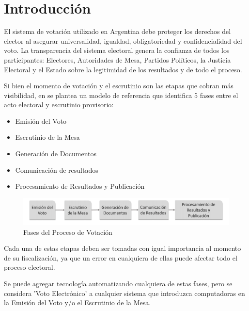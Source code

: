 \documentclass{llncs}
\begin{document}
\section{Introducción}
%

El sistema de votación utilizado en Argentina debe proteger los derechos del elector al asegurar universalidad, igualdad, obligatoriedad y confidencialidad del voto. La transparencia del sistema electoral genera la confianza de todos los participantes: Electores, Autoridades de Mesa, Partidos Políticos, la Justicia Electoral y el Estado sobre la legitimidad de los resultados y de todo el proceso.

Si bien el momento de votación y el escrutinio son las etapas que cobran más visibilidad, en \cite{conicet} se plantea un modelo de referencia que identifica 5 fases entre el acto electoral y escrutinio provisorio:
\begin{itemize}
\item Emisión del Voto
\item Escrutinio de la Mesa
\item Generación de Documentos
\item Comunicación de resultados
\item Procesamiento de Resultados y Publicación
\end{itemize}

\begin{figure}
\begin{center}
\includegraphics[width=12cm]{img/fases.png}
\end{center}
\caption{Fases del Proceso de Votación}
\label{1fig}
\end{figure}

Cada una de estas etapas deben ser tomadas con igual importancia al momento de su fiscalización, ya que un error en cualquiera de ellas puede afectar todo el proceso electoral.

Se puede agregar tecnología automatizando cualquiera de estas fases, pero se considera 'Voto Electrónico' a cualquier sistema que introduzca computadoras en la Emisión del Voto y/o el Escrutinio de la Mesa.  
\end{document}
